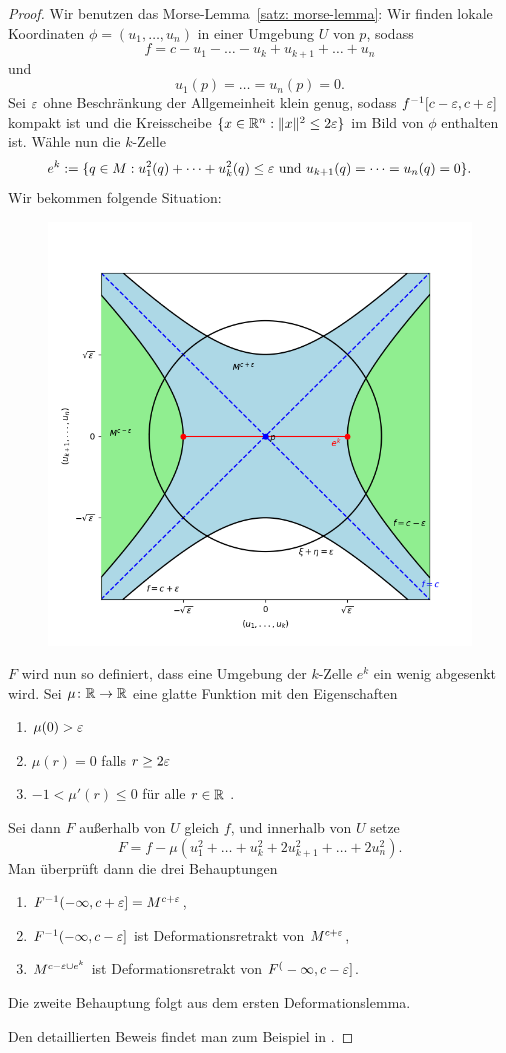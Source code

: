 \begin{proof}
    Wir benutzen das Morse-Lemma~\ref{satz: morse-lemma}:
    Wir finden lokale Koordinaten $\phi = (u_1, \dots, u_n)$ in einer Umgebung $U$ von $p$, sodass 
    \[ f = c - u_1 - \dots - u_k + u_{k + 1} + \dots + u_n \]
    und
    \[ u_1 (p) = \dots = u_n(p) = 0 . \]
    Sei $\varepsilon$ ohne Beschränkung der Allgemeinheit klein genug, sodass $f^{-1}[c - \varepsilon, c + \varepsilon]$ 
    kompakt ist und die Kreisscheibe $\{ x \in { \mathbb R }^n : \| x \|^2 \leq 2 \varepsilon \}$ im Bild von $\phi$ 
    enthalten ist. Wähle nun die $k$-Zelle 
    \[ e^k := \{ q \in M : u_1^2 (q) + \dots + u_k^2 (q) \leq \varepsilon \text{ und }
        u_{k + 1} (q) = \dots = u_n (q) = 0 \} . \]
    Wir bekommen folgende Situation:
    \begin{figure}[H]
        \centering
        \includegraphics[width=0.5\linewidth]{../resources/Me-Diagram6-U-parameterized.png}
        \label{fig:me-diagram6}
    \end{figure}
    $F$ wird nun so definiert, dass eine Umgebung der $k$-Zelle $e^k$ ein wenig abgesenkt wird.
    Sei $\mu \colon { \mathbb R } \to { \mathbb R }$ eine glatte Funktion mit den Eigenschaften
    \begin{enumerate}
        \item $\mu(0) > \varepsilon$
        \item $\mu (r) = 0$ falls $r \geq 2 \varepsilon$
        \item $-1 < \mu' (r) \leq 0$ für alle $r \in { \mathbb R }$ .
    \end{enumerate}
    Sei dann $F$ außerhalb von $U$ gleich $f$, und innerhalb von $U$ setze
    \[ F = f - \mu ( u_1^2 + \dots + u_k^2 + 2 u_{k + 1}^2 + \dots + 2 u_n^2) . \]
    Man überprüft dann die drei Behauptungen
    \begin{enumerate}
        \item $F^{-1}(- \infty, c + \varepsilon] = M^{c + \varepsilon}$,
        \item $F^{-1}(- \infty, c - \varepsilon]$ ist Deformationsretrakt von $M^{c + \varepsilon}$,
        \item $M^{c - \varepsilon \cup e^k}$ ist Deformationsretrakt von $F^(- \infty, c - \varepsilon]$.
    \end{enumerate}
    Die zweite Behauptung folgt aus dem ersten Deformationslemma.
    
    Den detaillierten Beweis findet man zum Beispiel in \cite{milnor}.
\end{proof}

